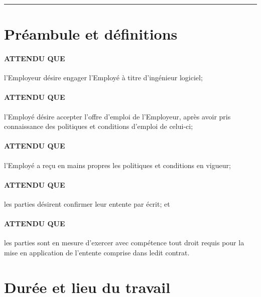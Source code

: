 \documentclass{article}
\begin{document}
    \hrule
    
    \section{Préambule et définitions}
    
    \paragraph{ATTENDU QUE} l'Employeur désire engager l'Employé à titre d'ingénieur logiciel;
    \paragraph{ATTENDU QUE} l'Employé désire accepter l'offre d'emploi de l'Employeur, après avoir pris connaissance des politiques et conditions d'emploi de celui-ci;
    \paragraph{ATTENDU QUE} l'Employé a reçu en mains propres les politiques et conditions en vigueur;
    \paragraph{ATTENDU QUE} les parties désirent confirmer leur entente par écrit; et
    \paragraph{ATTENDU QUE} les parties sont en mesure d'exercer avec compétence tout droit requis pour la mise en application de l'entente comprise dans ledit contrat.
    
    \vfill%
    {\centering%
    \par}%
    \vfill
    
    \pagebreak
    
    
    
    \section{Durée et lieu du travail}
\end{document}
